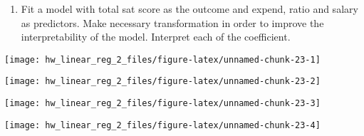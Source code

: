 \documentclass[]{article}
\newenvironment{Shaded}{\begin{snugshade}}{\end{snugshade}}
\newcommand{\KeywordTok}[1]{\textcolor[rgb]{0.13,0.29,0.53}{\textbf{#1}}}
\newcommand{\NormalTok}[1]{#1}
\newcommand{\OperatorTok}[1]{\textcolor[rgb]{0.81,0.36,0.00}{\textbf{#1}}}
\providecommand{\tightlist}{%
  \setlength{\itemsep}{0pt}\setlength{\parskip}{0pt}}
\begin{document}
\begin{enumerate}
\def\labelenumi{\arabic{enumi}.}
\tightlist
\item
  Fit a model with total sat score as the outcome and expend, ratio and
  salary as predictors. Make necessary transformation in order to
  improve the interpretability of the model. Interpret each of the
  coefficient.
\end{enumerate}

\begin{Shaded}
\end{Shaded}

\begin{center}\texttt{[image: hw\_linear\_reg\_2\_files/figure-latex/unnamed-chunk-23-1]} \end{center}

\begin{Shaded}
\end{Shaded}

\begin{center}\texttt{[image: hw\_linear\_reg\_2\_files/figure-latex/unnamed-chunk-23-2]} \end{center}

\begin{Shaded}
\end{Shaded}

\begin{center}\texttt{[image: hw\_linear\_reg\_2\_files/figure-latex/unnamed-chunk-23-3]} \end{center}

\begin{Shaded}
\end{Shaded}

\begin{center}\texttt{[image: hw\_linear\_reg\_2\_files/figure-latex/unnamed-chunk-23-4]} \end{center}
\end{document}
